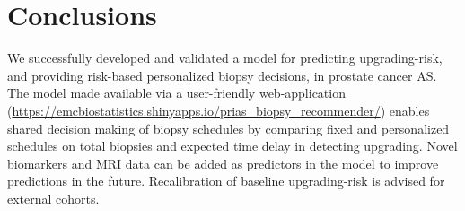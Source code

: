\section{Conclusions}
We successfully developed and validated a model for predicting upgrading-risk, and providing risk-based personalized biopsy decisions, in prostate cancer AS. The model made available via a user-friendly web-application (\url{https://emcbiostatistics.shinyapps.io/prias_biopsy_recommender/}) enables shared decision making of biopsy schedules by comparing fixed and personalized schedules on total biopsies and expected time delay in detecting upgrading. Novel biomarkers and MRI data can be added as predictors in the model to improve predictions in the future. Recalibration of baseline upgrading-risk is advised for external cohorts.